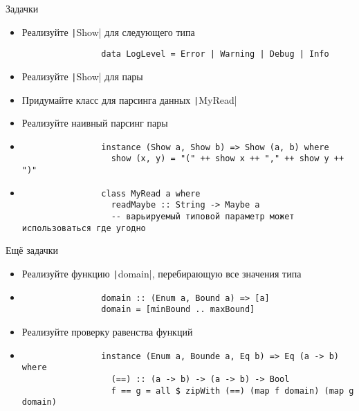     \begin{frame}[fragile]{Задачки}
        \begin{itemize}
            \item[\todo] Реализуйте \texttt|Show| для следующего типа
            \begin{verbatim}
                data LogLevel = Error | Warning | Debug | Info
            \end{verbatim}
            \item[\todo] Реализуйте \texttt|Show| для пары
            \item[\todo] Придумайте класс для парсинга данных \texttt|MyRead|
            \item[\todo] Реализуйте наивный парсинг пары
            \item[\answer] \pause
            \begin{verbatim}
                instance (Show a, Show b) => Show (a, b) where
                  show (x, y) = "(" ++ show x ++ "," ++ show y ++ ")"
            \end{verbatim}
            \item[\answer] \pause
            \begin{verbatim}
                class MyRead a where
                  readMaybe :: String -> Maybe a
                  -- варьируемый типовой параметр может использоваться где угодно
            \end{verbatim}
        \end{itemize}
    \end{frame}

    \begin{frame}[fragile]{Ещё задачки}
        \begin{itemize}
            \item[\todo] Реализуйте функцию \texttt|domain|, перебирающую все значения типа
            \item[\answer] \pause
            \begin{verbatim}
                domain :: (Enum a, Bound a) => [a]
                domain = [minBound .. maxBound]
            \end{verbatim}
            \item[\todo] Реализуйте проверку равенства функций
            \item[\answer] \pause
            \begin{verbatim}
                instance (Enum a, Bounde a, Eq b) => Eq (a -> b) where
                  (==) :: (a -> b) -> (a -> b) -> Bool
                  f == g = all $ zipWith (==) (map f domain) (map g domain)
            \end{verbatim}
        \end{itemize}
    \end{frame}





